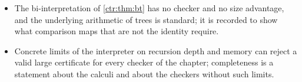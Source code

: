 \begin{itemize}
with the incoming-inclusive compact envelope $244$, $265$, $477$, attained by different
programs (a token program of , $244/272/604$; a node program of
, $249/265/605$; byte programs of ,
$272/306/477$, and of , $273/305/477$), and with the whole-input
envelope $249$, $271$, $477$, and reaches neither. Its compact program ($274/306/476$) is the
composition of \cref{cert:prop:leaf-compositions}(b) and implements the inherited guarded
scalar presentation, not $\mathcal K_{\mathrm{Root}}$. No minimality of the axiomatization or
of a checker is claimed.
\item The bi-interpretation of \cref{ctr:thm:bt} has no checker and no size advantage, and the
underlying arithmetic of trees is standard; it is recorded to show what comparison maps that are
not the identity require.
\item Concrete limits of the interpreter on recursion depth and memory can reject a valid
large certificate for every checker of the chapter; completeness is a statement about the
calculi and about the checkers without such limits.
\end{itemize}
